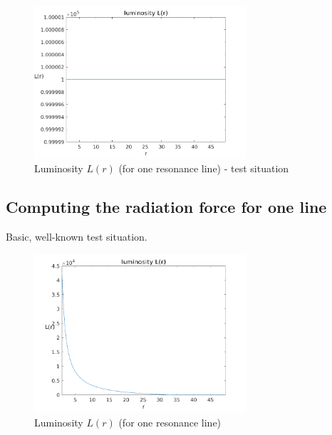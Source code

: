 \documentclass[../main/main.tex]{subfiles}
\begin{document}
\begin{figure}[!htp]
\centering
\includegraphics[width=0.7\textwidth]{../../two_resonance_lines/figures/luminosity_one_resonance_line_one_direction.png}
\caption{Luminosity $L(r)$ (for one resonance line) - test situation}
\label{luminosity_one_resonance_line_test}
\end{figure}

\newpage
\subsection{Computing the radiation force for one line}
Basic, well-known test situation.
\begin{figure}[!htp]
\centering
\includegraphics[width=0.7\textwidth]{../../two_resonance_lines/figures/luminosity_one_resonance_line.png}
\caption{Luminosity $L(r)$ (for one resonance line)}
\label{luminosity_one_resonance_line}
\end{figure}
\end{document}

